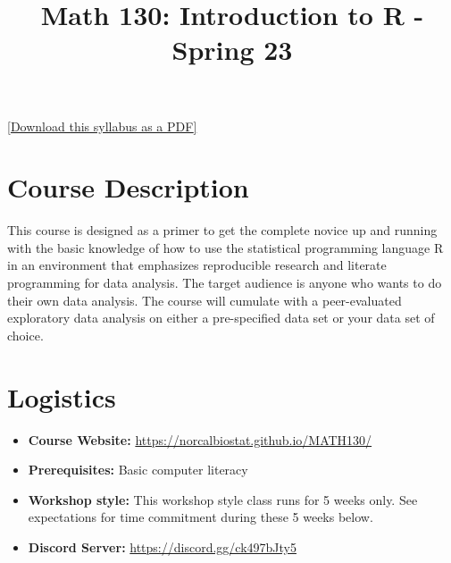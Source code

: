 \documentclass[
  11pt,
]{article}
\title{Math 130: Introduction to R - Spring 23}
\author{}
\date{\vspace{-2.5em}}
\providecommand{\tightlist}{%
  \setlength{\itemsep}{0pt}\setlength{\parskip}{0pt}}
\begin{document}
\maketitle

\href{syllabus.pdf}{{[}Download this syllabus as a PDF{]}}

\hypertarget{course-description}{%
\section{Course Description}\label{course-description}}

This course is designed as a primer to get the complete novice up and
running with the basic knowledge of how to use the statistical
programming language R in an environment that emphasizes reproducible
research and literate programming for data analysis. The target audience
is anyone who wants to do their own data analysis. The course will
cumulate with a peer-evaluated exploratory data analysis on either a
pre-specified data set or your data set of choice.

\hypertarget{logistics}{%
\section{Logistics}\label{logistics}}

\begin{itemize}
\tightlist
\item
  \textbf{Course Website:}
  \url{https://norcalbiostat.github.io/MATH130/}
\item
  \textbf{Prerequisites:} Basic computer literacy
\item
  \textbf{Workshop style:} This workshop style class runs for 5 weeks
  only. See expectations for time commitment during these 5 weeks
  below.\\
\item
  \textbf{Discord Server:} \url{https://discord.gg/ck497bJty5}
\end{itemize}
\end{document}
